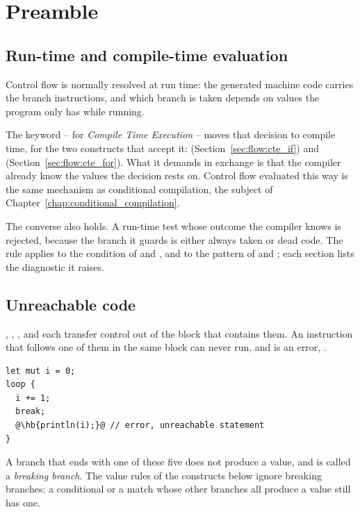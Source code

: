 \section{Preamble}
\label{sec:flow:preamble}

\subsection{Run-time and compile-time evaluation}
\label{sec:flow:cte}

Control flow is normally resolved at run time: the generated machine code carries
the branch instructions, and which branch is taken depends on values the program
only has while running.

The keyword  -- for \textit{Compile Time Execution} -- moves that
decision to compile time, for the two constructs that accept it: 
(Section~\ref{sec:flow:cte_if}) and 
(Section~\ref{sec:flow:cte_for}). What it demands in exchange is that the
compiler already know the values the decision rests on. Control flow evaluated
this way is the same mechanism as conditional compilation, the subject of
Chapter~\ref{chap:conditional_compilation}.

The converse also holds. A run-time test whose outcome the compiler knows is
rejected, because the branch it guards is either always taken or dead code. The
rule applies to the condition of  and , and to the
pattern of  and ; each section lists the
diagnostic it raises.

\subsection{Unreachable code}
\label{sec:flow:unreachable}

, , ,  and
 each transfer control out of the block that contains them. An
instruction that follows one of them in the same block can never run, and is an
error, .

\begin{lstlisting}[style=coloredverbatimError, escapechar=@]
let mut i = 0;
loop {
  i += 1;
  break;
  @\hb{println(i);}@ // error, unreachable statement
}
\end{lstlisting}

A branch that ends with one of these five does not produce a value, and is
called a \textit{breaking branch}. The value rules of the constructs below
ignore breaking branches: a conditional or a match whose other branches all
produce a value still has one.

